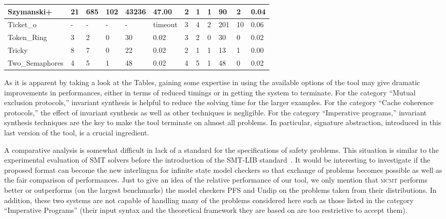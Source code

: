 \documentclass{LMCS}
\theoremstyle{plain}\newtheorem{assumption}[thm]{Assumption}
\theoremstyle{plain}\newtheorem{proposition}[thm]{Proposition}
\theoremstyle{plain}\newtheorem{property}[thm]{Property}
\theoremstyle{plain}\newtheorem{example}[thm]{Example}
\theoremstyle{plain}\newtheorem{claim}[thm]{Claim}
\theoremstyle{plain}\newtheorem{lemma}[thm]{Lemma}
\begin{document}
\begin{table}[t]
\begin{tabular}{||l|l|l|l|l|l||l|l|l|l|l|l||}
Szymanski+ & 	21 & 	685 & 	102 & 	43236 & 	47.00
           & 	2 & 	1 & 	1 & 	90 & 	2 & 	0.04 \\ \hline
Ticket\_o & 	- & 	- & 	- & 	- & 	timeout 
          & 	3 & 	4 & 	2 & 	201 & 	10 & 	0.06 \\ \hline
Token\_Ring & 	3 & 	2 & 	0 & 	30 & 	0.02 
            & 	3 & 	2 & 	0 & 	30 & 	0 & 	0.02 \\ \hline
Tricky & 	8 & 	7 & 	0 & 	22 & 	0.02 
       & 	2 & 	1 & 	1 & 	13 & 	1 & 	0.00 \\ \hline
Two\_Semaphores & 	4 & 	5 & 	1 & 	48 & 	0.02 
                & 	4 & 	5 & 	1 & 	48 & 	0 & 	0.02 \\ \hline\hline
\end{tabular}
\end{table}
 
As it is apparent by taking a look at the Tables, gaining some
expertise in using the available options of the tool may give dramatic
improvements in performances, either in terms of reduced timings or in
getting the system to terminate.  For the category ``Mutual exclusion
protocols,'' invariant synthesis is helpful to reduce the solving time
for the larger examples.  For the category ``Cache coherence
protocols,'' the effect of invariant synthesis as well as other
techniques is negligible.  For the category ``Imperative programs,''
invariant synthesis techniques are the key to make the tool terminate
on almost all problems.  In particular, signature abstraction,
introduced in this last version of the tool, is a crucial ingredient.

A comparative analysis is somewhat difficult in lack of a standard for
the specifications of safety problems.  This situation is similar to
the experimental evaluation of SMT solvers before the introduction of
the SMT-LIB standard~\cite{smtlib}.  It would be interesting to
investigate if the proposed format can become the new interlingua for
infinite state model checkers so that exchange of problems becomes
possible as well as the fair comparison of performances.  Just to give
an idea of the relative performance of our tool, we only mention that
\textsc{mcmt} performs better or outperforms (on the largest
benchmarks) the model checkers PFS and Undip on the problems taken
from their distributions.  In addition, these two systems are not
capable of handling many of the problems considered here such as those
listed in the category ``Imperative Programs'' (their input syntax and
the theoretical framework they are based on are too restrictive to
accept them).
\end{document}
